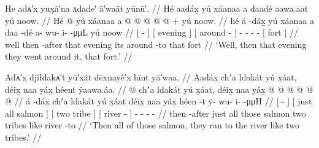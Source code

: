 \ex\label{ex:100-118-went-around-it}%
%
\begingl
	\glpreamble	He adᴀ′x yux̣ā′na ᴀdade′ ā′waāt yūnū′. //
	\glpreamble	Hé aadáx̱ yú xáanaa a daadé aawa.aat yú noow. //
	\gla	Hé {}  @ {} {} 
		{} yú xáanaa {} 
		{} a  @ {} {} 
		 @ {} @ {} @ {} @ {} +
		{} yú noow. {} //
	\glb	hé {} á -dáx̱ {} 
		{} yú xáanaa {} 
		{} a daa -dé {} 
		a- wu- i-  -μμL
		{} yú noow {} //
	\glc	{} {}[  - {}]
		{}[  evening {}]
		{}[  around - {}]
		- - -  -
		{}[  fort {}] //
	\gld	well {} then -after {} 
		{} that evening {} 
		{} its around -to {} 
		 {} {} {} {}
		{} that fort {} //
	\glft	‘Well, then that evening they went around it, that fort.’
		//
\endgl
\xe

\ex\label{ex:100-119-ran-to-river}%
%
\begingl
	\glpreamble	Adᴀ′x djîłdakᴀ′t yū′xāt dēxnayê′x hīnt ỵā′waa. //
	\glpreamble	Aadáx̱ chʼa ldakát yú x̱áat, déix̱ naa yáx̱ héent ÿaawa.áa. //
	\gla	{}  @ {} {} 
		{} chʼa ldakát yú x̱áat, {} 
		{} déix̱ naa yáx̱ {} 
		{}  @ {} {}
		 @ {} @ {} @ {} @ {} @ {} //
	\glb	{} á -dáx̱ {} 
		{} chʼa ldakát yú x̱áat {} 
		{} déix̱ naa yáx̱ {} 
		{} héen -t {} 
		ÿ- wu- i-  -μμH //
	\glc	{}[  - {}]
		{}[ just all  salmon {}]
		{}[ two tribe  {}]
		{}[ river - {}]
		- - -  - //
	\gld	{} then -after {}
		{} just all those salmon {}
		{} two tribes like {}
		{} river -to {}
		 {} {} {} {} //
	\glft	‘Then all of those salmon, they ran to the river like two tribes.’
		//
\endgl
\xe

